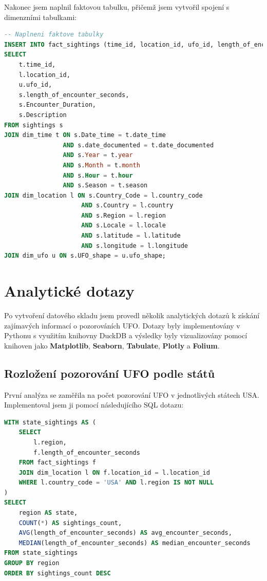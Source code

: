 \documentclass[a4paper,12pt]{article}
\begin{document}
Nakonec jsem naplnil faktovou tabulku, přičemž jsem vytvořil spojení s dimenzními tabulkami:

\begin{lstlisting}[language=sql, caption=Naplnění faktové tabulky]
-- Naplneni faktove tabulky
INSERT INTO fact_sightings (time_id, location_id, ufo_id, length_of_encounter_seconds, encounter_duration, description)
SELECT 
    t.time_id,
    l.location_id,
    u.ufo_id,
    s.length_of_encounter_seconds,
    s.Encounter_Duration,
    s.Description
FROM sightings s
JOIN dim_time t ON s.Date_time = t.date_time 
                AND s.date_documented = t.date_documented 
                AND s.Year = t.year 
                AND s.Month = t.month 
                AND s.Hour = t.hour 
                AND s.Season = t.season
JOIN dim_location l ON s.Country_Code = l.country_code 
                     AND s.Country = l.country 
                     AND s.Region = l.region 
                     AND s.Locale = l.locale 
                     AND s.latitude = l.latitude 
                     AND s.longitude = l.longitude
JOIN dim_ufo u ON s.UFO_shape = u.ufo_shape;
\end{lstlisting}

\section{Analytické dotazy}
Po vytvoření datového skladu jsem provedl několik analytických dotazů k získání zajímavých informací o pozorováních UFO. Dotazy byly implementovány v Pythonu s využitím knihovny DuckDB a výsledky byly vizualizovány pomocí knihoven jako \textbf{Matplotlib}, \textbf{Seaborn}, \textbf{Tabulate}, \textbf{Plotly} a \textbf{Folium}.

\subsection{Rozložení pozorování UFO podle států}
První analýza se zaměřila na počet pozorování UFO v jednotlivých státech USA. Implementoval jsem ji pomocí následujícího SQL dotazu:

\begin{lstlisting}[language=sql, caption=SQL dotaz pro počet pozorování podle států]
WITH state_sightings AS (
    SELECT
        l.region,
        f.length_of_encounter_seconds
    FROM fact_sightings f
    JOIN dim_location l ON f.location_id = l.location_id
    WHERE l.country_code = 'USA' AND l.region IS NOT NULL
)
SELECT
    region AS state,
    COUNT(*) AS sightings_count,
    AVG(length_of_encounter_seconds) AS avg_encounter_seconds,
    MEDIAN(length_of_encounter_seconds) AS median_encounter_seconds
FROM state_sightings
GROUP BY region
ORDER BY sightings_count DESC
\end{lstlisting}
\end{document}
